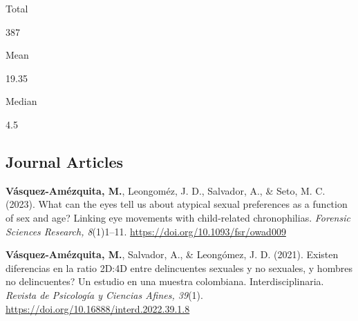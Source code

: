 \documentclass[11pt,a4paper,]{awesome-cv}
\begin{document}
\begin{tcolorbox}
  \begin{minipage}[c]{0.325\linewidth}  
    \begin{center} 
      \begin{small} Total \end{small} 
      \begin{LARGE} 387 \end{LARGE} 
    \end{center}
  \end{minipage} 
  \begin{minipage}[c]{0.325\linewidth}
    \begin{center} 
      \begin{small} Mean \end{small} 
      \begin{LARGE} 19.35 \end{LARGE}
    \end{center}
  \end{minipage} 
  \begin{minipage}[c]{0.325\linewidth}
    \begin{center}  
      \begin{small} Median \end{small} 
      \begin{LARGE} 4.5 \end{LARGE}
   \end{center}
  \end{minipage} 
\end{tcolorbox}

\subsection{\texorpdfstring{\textbf{Journal Articles}}{}}\label{section}

\begingroup
\footnotesize
\setlength{\parindent}{-0.5in}
\setlength{\leftskip}{0.5in}

\textbf{Vásquez-Amézquita, M.}, Leongoméz, J. D., Salvador, A., \& Seto,
M. C. (2023). What can the eyes tell us about atypical sexual
preferences as a function of sex and age? Linking eye movements with
child-related chronophilias. \emph{Forensic Sciences Research,
8}(1)1--11. \url{https://doi.org/10.1093/fsr/owad009}

\textbf{Vásquez-Amézquita, M.}, Salvador, A., \& Leongómez, J. D.
(2021). Existen diferencias en la ratio 2D:4D entre delincuentes
sexuales y no sexuales, y hombres no delincuentes? Un estudio en una
muestra colombiana. Interdisciplinaria. \emph{Revista de Psicología y
Ciencias Afines, 39}(1).
\url{https://doi.org/10.16888/interd.2022.39.1.8}
\end{document}
